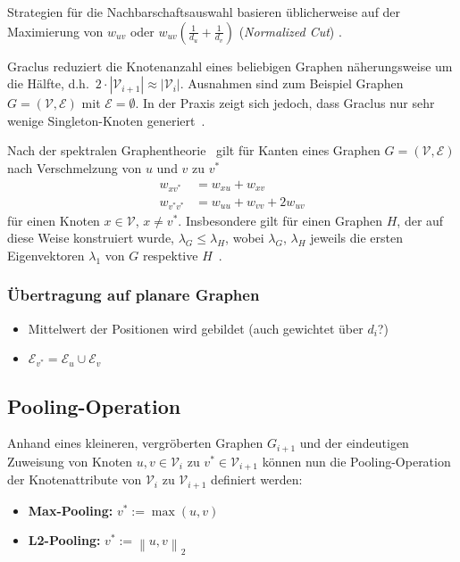 Strategien für die Nachbarschaftsauswahl basieren üblicherweise auf der Maximierung von $w_{uv}$ oder $w_{uv}\left( \frac{1}{d_u} + \frac{1}{d_v} \right)$ (\emph{Normalized Cut}) .

Graclus reduziert die Knotenanzahl eines beliebigen Graphen näherungsweise um die Hälfte, d.h.\ $2 \cdot |\mathcal{V}_{i+1}| \approx |\mathcal{V}_i|$.
Ausnahmen sind zum Beispiel Graphen $G = (\mathcal{V}, \mathcal{E})$ mit $\mathcal{E} = \emptyset$.
In der Praxis zeigt sich jedoch, dass Graclus nur sehr wenige Singleton-Knoten generiert~\cite{Defferrard}.

Nach der spektralen Graphentheorie~\cite{Chung} gilt für Kanten eines Graphen $G = (\mathcal{V}, \mathcal{E})$ nach Verschmelzung von $u$ und $v$ zu $v^*$
\begin{align}
  w_{xv^*} &= w_{xu} + w_{xv}\\
  w_{v^*v^*} &= w_{uu} + w_{vv} + 2w_{uv}
\end{align}
für einen Knoten $x \in \mathcal{V}$, $x \neq v^*$.
Insbesondere gilt für einen Graphen $H$, der auf diese Weise konstruiert wurde, $\lambda_G \leq \lambda_H$, wobei $\lambda_G$, $\lambda_H$ jeweils die ersten Eigenvektoren $\lambda_1$ von $G$ respektive $H$~\cite{Chung}.

\subsubsection{Übertragung auf planare Graphen}

\begin{itemize}
  \item Mittelwert der Positionen wird gebildet (auch gewichtet über $d_i$?)
  \item $\mathcal{E}_{v^*} = \mathcal{E}_u \cup \mathcal{E}_v$ 
\end{itemize}

\subsection{Pooling-Operation}

Anhand eines kleineren, vergröberten Graphen $G_{i+1}$ und der eindeutigen Zuweisung von Knoten $u, v \in \mathcal{V}_i$ zu $v^* \in \mathcal{V}_{i+1}$ können nun die Pooling-Operation der Knotenattribute von $\mathcal{V}_{i}$ zu $\mathcal{V}_{i+1}$ definiert werden:

\begin{itemize}
  \item \textbf{Max-Pooling:} $v^* := \max(u, v)$
  \item \textbf{L2-Pooling:} $v^* := \left\| u, v \right\|_2$
\end{itemize}
